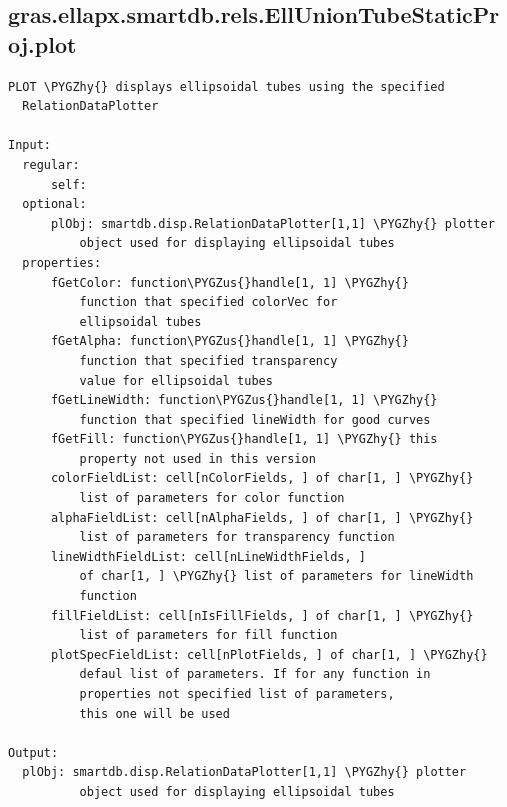 \documentclass[letterpaper,10pt,english]{sphinxmanual}
\def\PYGZus{\char`\_}
\def\PYGZhy{\char`\-}
\begin{document}
\subsection{gras.ellapx.smartdb.rels.EllUnionTubeStaticProj.plot}
\label{chap_functions:gras-ellapx-smartdb-rels-elluniontubestaticproj-plot}
\begin{Verbatim}[commandchars=\\\{\}]
PLOT \PYGZhy{} displays ellipsoidal tubes using the specified
  RelationDataPlotter

Input:
  regular:
      self:
  optional:
      plObj: smartdb.disp.RelationDataPlotter[1,1] \PYGZhy{} plotter
          object used for displaying ellipsoidal tubes
  properties:
      fGetColor: function\PYGZus{}handle[1, 1] \PYGZhy{}
          function that specified colorVec for
          ellipsoidal tubes
      fGetAlpha: function\PYGZus{}handle[1, 1] \PYGZhy{}
          function that specified transparency
          value for ellipsoidal tubes
      fGetLineWidth: function\PYGZus{}handle[1, 1] \PYGZhy{}
          function that specified lineWidth for good curves
      fGetFill: function\PYGZus{}handle[1, 1] \PYGZhy{} this
          property not used in this version
      colorFieldList: cell[nColorFields, ] of char[1, ] \PYGZhy{}
          list of parameters for color function
      alphaFieldList: cell[nAlphaFields, ] of char[1, ] \PYGZhy{}
          list of parameters for transparency function
      lineWidthFieldList: cell[nLineWidthFields, ]
          of char[1, ] \PYGZhy{} list of parameters for lineWidth
          function
      fillFieldList: cell[nIsFillFields, ] of char[1, ] \PYGZhy{}
          list of parameters for fill function
      plotSpecFieldList: cell[nPlotFields, ] of char[1, ] \PYGZhy{}
          defaul list of parameters. If for any function in
          properties not specified list of parameters,
          this one will be used

Output:
  plObj: smartdb.disp.RelationDataPlotter[1,1] \PYGZhy{} plotter
          object used for displaying ellipsoidal tubes
\end{Verbatim}
\end{document}
